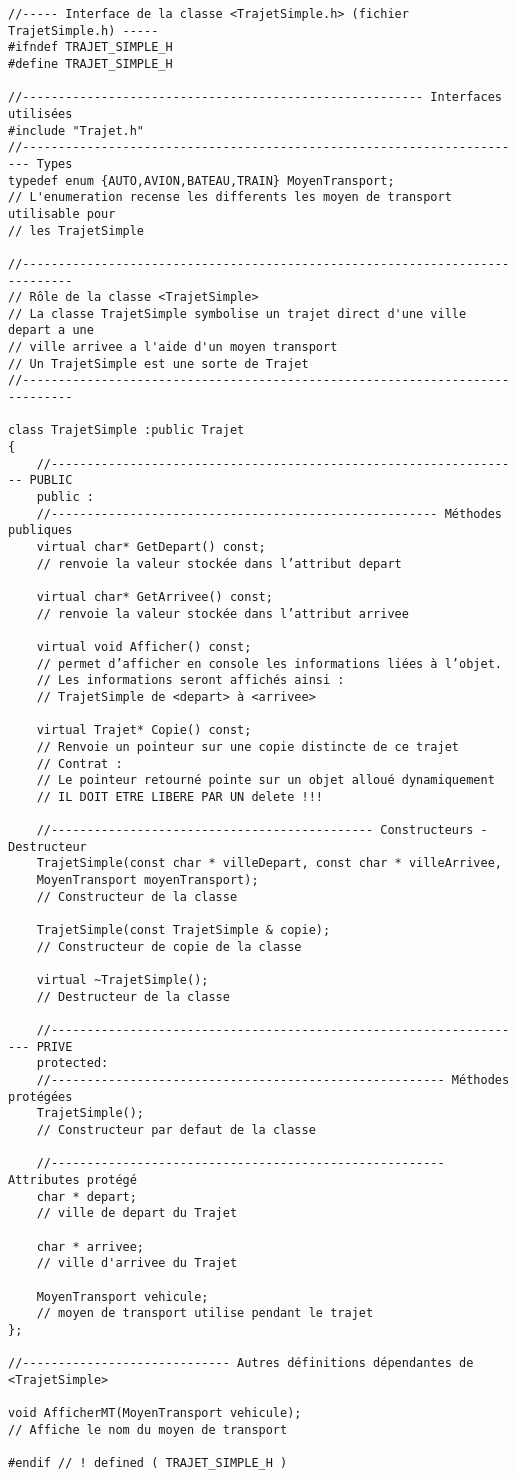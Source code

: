 \begin{verbatim}
//----- Interface de la classe <TrajetSimple.h> (fichier TrajetSimple.h) -----
#ifndef TRAJET_SIMPLE_H
#define TRAJET_SIMPLE_H

//-------------------------------------------------------- Interfaces utilisées
#include "Trajet.h"
//----------------------------------------------------------------------- Types
typedef enum {AUTO,AVION,BATEAU,TRAIN} MoyenTransport;
// L'enumeration recense les differents les moyen de transport utilisable pour
// les TrajetSimple

//-----------------------------------------------------------------------------
// Rôle de la classe <TrajetSimple>
// La classe TrajetSimple symbolise un trajet direct d'une ville depart a une
// ville arrivee a l'aide d'un moyen transport
// Un TrajetSimple est une sorte de Trajet
//-----------------------------------------------------------------------------

class TrajetSimple :public Trajet
{
	//------------------------------------------------------------------ PUBLIC
	public :
	//------------------------------------------------------ Méthodes publiques
	virtual char* GetDepart() const;
	// renvoie la valeur stockée dans l’attribut depart
	
	virtual char* GetArrivee() const;
	// renvoie la valeur stockée dans l’attribut arrivee
	
	virtual void Afficher() const;
	// permet d’afficher en console les informations liées à l’objet.
	// Les informations seront affichés ainsi :
	// TrajetSimple de <depart> à <arrivee>
	
	virtual Trajet* Copie() const;
	// Renvoie un pointeur sur une copie distincte de ce trajet
	// Contrat :
	// Le pointeur retourné pointe sur un objet alloué dynamiquement
	// IL DOIT ETRE LIBERE PAR UN delete !!!
	
	//--------------------------------------------- Constructeurs - Destructeur
	TrajetSimple(const char * villeDepart, const char * villeArrivee,
	MoyenTransport moyenTransport);
	// Constructeur de la classe
	
	TrajetSimple(const TrajetSimple & copie);
	// Constructeur de copie de la classe
	
	virtual ~TrajetSimple();
	// Destructeur de la classe
	
	//------------------------------------------------------------------- PRIVE
	protected:
	//------------------------------------------------------- Méthodes protégées
	TrajetSimple();
	// Constructeur par defaut de la classe
	
	//------------------------------------------------------- Attributes protégé
	char * depart;
	// ville de depart du Trajet
	
	char * arrivee;
	// ville d'arrivee du Trajet
	
	MoyenTransport vehicule;
	// moyen de transport utilise pendant le trajet
};

//----------------------------- Autres définitions dépendantes de <TrajetSimple>

void AfficherMT(MoyenTransport vehicule);
// Affiche le nom du moyen de transport

#endif // ! defined ( TRAJET_SIMPLE_H )
\end{verbatim}
